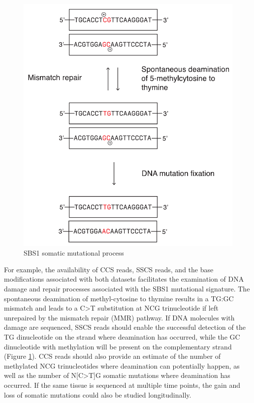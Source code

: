 \begin{figure}[htbp!]
\caption{SBS1 somatic mutational process}
\label{figure:single-strand-specific-mutation}
\begin{centering}
\includegraphics[width=\textwidth]{spontaneous_deamination_horizontal.pdf} 
\end{centering}
\end{figure}

For example, the availability of CCS reads, SSCS reads, and the base modifications associated with both datasets facilitates the examination of DNA damage and repair processes associated with the SBS1 mutational signature. The spontaneous deamination of methyl-cytosine to thymine results in a TG:GC mismatch and leads to a C>T substitution at NCG trinucleotide if left unrepaired by the mismatch repair (MMR) pathway. If DNA molecules with damage are sequenced, SSCS reads should enable the successful detection of the TG dinucleotide on the strand where deamination has occurred, while the GC dinucleotide with methylation will be present on the complementary strand (Figure \ref{figure:single-strand-specific-mutation}). CCS reads should also provide an estimate of the number of methylated NCG trinucleotides where deamination can potentially happen, as well as the number of N[C>T]G somatic mutations where deamination has occurred. If the same tissue is sequenced at multiple time points, the gain and loss of somatic mutations could also be studied longitudinally.  

